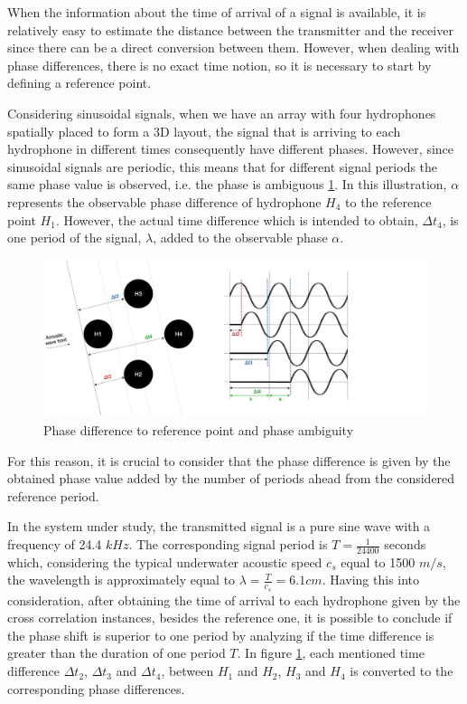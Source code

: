 When the information about the time of arrival of a signal is available, it is relatively easy to estimate the distance between the transmitter and the receiver since there can be a direct conversion between them. However, when dealing with phase differences, there is no exact time notion, so it is necessary to start by defining a reference point. 

Considering sinusoidal signals, when we have an array with four hydrophones spatially placed to form a 3D layout, the signal that is arriving to each  hydrophone in different times consequently have different phases. However, since sinusoidal signals are periodic, this means that for different signal periods the same phase value is observed, i.e. the phase is ambiguous \ref{fig:phasediff}. In this illustration, $\alpha$ represents the observable phase difference of hydrophone $H_4$ to the reference point $H_1$. However, the actual time difference which is intended to obtain, $\Delta t_4$, is one period of the signal, $\lambda$, added to the observable phase $\alpha$.

\begin{figure}[!htbp]
	\centering
	\includegraphics[width=1.2\textwidth]{figures/phase-diff}
	\caption{Phase difference to reference point and phase ambiguity}
	\label{fig:phasediff}
\end{figure}

For this reason, it is crucial to consider that the phase difference is given by the obtained phase value added by the number of periods ahead from the considered reference period.

In the system under study, the transmitted signal is a pure sine wave with a frequency of 24.4 $kHz$. The corresponding signal period is $T = \frac{1}{24400} $ seconds which, considering the typical underwater acoustic speed $c_s$ equal to 1500 $m/s$, the wavelength is approximately equal to $\lambda = \frac{T}{c_s} = 6.1 cm$. Having this into consideration, after obtaining the time of arrival to each hydrophone given by the cross correlation instances, besides the reference one, it is possible to conclude if the phase shift is superior to one period by analyzing if the time difference is greater than the duration of one period $T$. In figure \ref{fig:phasediff}, each mentioned time difference $\Delta t_2$, $\Delta t_3$ and $\Delta t_4$, between $H_1$ and $H_2$, $H_3$ and $H_4$ is converted to the corresponding phase differences.

